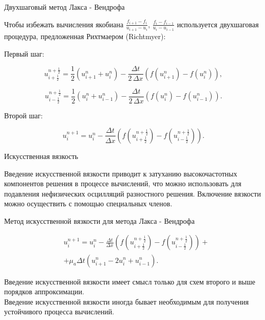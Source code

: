 \documentclass[10pt,xcolor=pst,aspectratio=169]{beamer}
\begin{document}
\begin{frame}{Двухшаговый метод Лакса - Вендрофа}

	\transdissolve[duration=0.1]
	\justifying
	\large

	Чтобы избежать вычисления якобиана $\frac{f_{i + 1} - f_{i}}{u_{i + 1} - u_{i}}$, $\frac{f_{i} - f_{i - 1}}{u_{i} - u_{i - 1}}$ используется двухшаговая процедура, предложенная Рихтмаером (Richtmyer):
	
	Первый шаг:

	\[
		u^{n + \frac{1}{2}}_{i + \frac{1}{2}} = \frac{1}{2}(u^{n}_{i + 1} + u^{n}_{i}) - \frac{\Delta t}{2\,\Delta x} \left( f(u^{n}_{i + 1}) - f(u^{n}_{i}) \right),
	\]

	\[
		u^{n + \frac{1}{2}}_{i - \frac{1}{2}} = \frac{1}{2}(u^{n}_{i} + u^{n}_{i - 1}) - \frac{\Delta t}{2\,\Delta x} \left( f(u^{n}_{i}) - f(u^{n}_{i - 1}) \right).
	\]

	Второй шаг:

	\[
		u^{n+1}_{i} = u^{n}_{i} - \frac{\Delta t}{\Delta x} \left( f(u^{n + \frac{1}{2}}_{i + \frac{1}{2}}) - f(u^{n + \frac{1}{2}}_{i - \frac{1}{2}}) \right).
	\]

\end{frame}

\begin{frame}{Искусственная вязкость}

	\transdissolve[duration=0.1]
	\justifying
	\large

	Введение искусственной вязкости приводит к затуханию высокочастотных компонентов решения в процессе вычислений, что можно использовать для подавления нефизических осцилляций разностного решения. Включение вязкости можно осуществить с помощью специальных членов.

\end{frame}

\begin{frame}{Метод искусственной вязкости для метода Лакса - Вендрофа}

	\transdissolve[duration=0.1]
	\justifying
	\large

	\[
		\begin{split}
			&u^{n+1}_{i} = u^{n}_{i} - \frac{\Delta t}{\Delta x} \left( f(u^{n + \frac{1}{2}}_{i + \frac{1}{2}}) - f(u^{n + \frac{1}{2}}_{i - \frac{1}{2}}) \right) + \\
			&+ \mu_{a} \Delta t \left( u^{n}_{i + 1} - 2 u^{n}_{i} + u^{n}_{i - 1} \right).
		\end{split}
	\]

	Введение искусственной вязкости имеет смысл только для схем второго и выше порядков аппроксимации.\\

	Введение искусственной вязкости иногда бывает необходимым для получения устойчивого процесса вычислений.

\end{frame}
\end{document}

